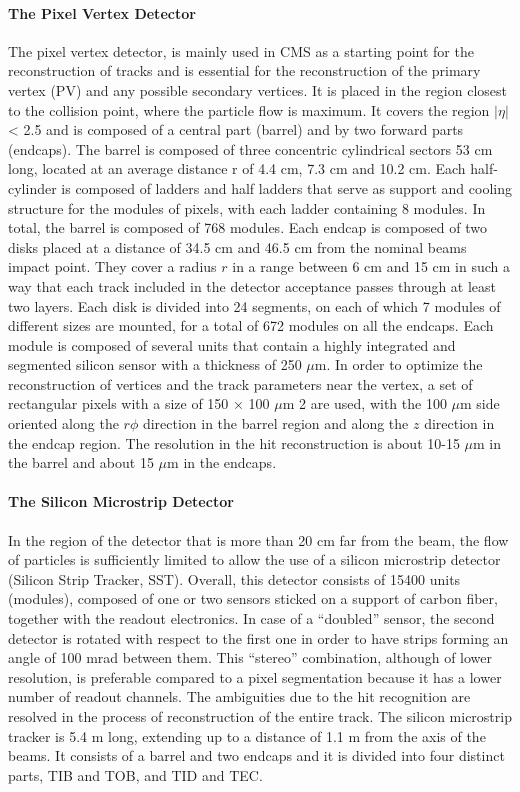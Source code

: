 \paragraph*{The Pixel Vertex Detector} The pixel vertex detector,  is mainly used in CMS as a starting point for
the reconstruction of tracks and is essential for the reconstruction of the primary vertex
(PV) and any possible secondary vertices. It is placed in the region closest to the collision
point, where the particle flow is maximum. It covers the region $|\eta|$ < 2.5 and is composed
of a central part (barrel) and by two forward parts (endcaps). The barrel is composed of
three concentric cylindrical sectors 53 cm long, located at an average distance r of 4.4 cm,
7.3 cm and 10.2 cm. Each half-cylinder is composed of ladders and half ladders that serve
as support and cooling structure for the modules of pixels, with each ladder containing 8
modules. In total, the barrel is composed of 768 modules. Each endcap is composed of
two disks placed at a distance of 34.5 cm and 46.5 cm from the nominal beams impact
point. They cover a radius $r$ in a range between 6 cm and 15 cm in such a way that each
track included in the detector acceptance passes through at least two layers. Each disk is
divided into 24 segments, on each of which 7 modules of different sizes are mounted, for
a total of 672 modules on all the endcaps. Each module is composed of several units that
contain a highly integrated and segmented silicon sensor with a thickness of 250 $\mu$m. In
order to optimize the reconstruction of vertices and the track parameters near the vertex,
a set of rectangular pixels with a size of 150 × 100 $\mu$m 2 are used, with the 100 $\mu$m side
oriented along the $r \phi$ direction in the barrel region and along the $z$ direction in the endcap
region. The resolution in the hit reconstruction is about 10-15 $\mu$m in the barrel and
about 15 $\mu$m in the endcaps.

\paragraph*{The Silicon Microstrip Detector} In the region of the detector that is more than 20 cm far from the beam, the flow of
particles is sufficiently limited to allow the use of a silicon microstrip detector (Silicon
Strip Tracker, SST). Overall, this detector consists of 15400 units (modules), composed
of one or two sensors sticked on a support of carbon fiber, together with the readout
electronics. In case of a “doubled” sensor, the second detector is rotated with respect
to the first one in order to have strips forming an angle of 100 mrad between them.
This “stereo” combination, although of lower resolution, is preferable compared to a pixel segmentation because it has a lower number of readout channels. 
The ambiguities due to
the hit recognition are resolved in the process of reconstruction of the entire track. The
silicon microstrip tracker is 5.4 m long, extending up to a distance of 1.1 m from the axis
of the beams. It consists of a barrel and two endcaps and it is divided into four distinct
parts, TIB and TOB, and TID and TEC.


